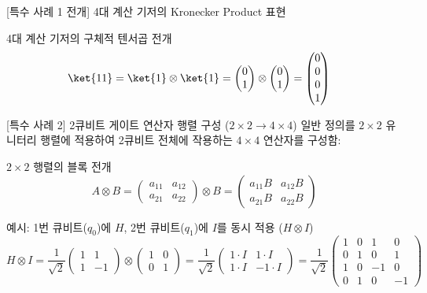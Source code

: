 \documentclass[aspectratio=169, 10pt]{beamer}
\begin{document}
\begin{frame}{[특수 사례 1 전개] 4대 계산 기저의 Kronecker Product 표현}
\begin{qcblock}{4대 계산 기저의 구체적 텐서곱 전개}
\begin{align*}
        \ket{11} &= \ket{1} \otimes \ket{1} = \begin{pmatrix} 0 \\ 1 \end{pmatrix} \otimes \begin{pmatrix} 0 \\ 1 \end{pmatrix} = \begin{pmatrix} 0 \\ 0 \\ 0 \\ 1 \end{pmatrix}
        \end{align*}
    \end{qcblock}
\end{frame}

\begin{frame}{[특수 사례 2] 2큐비트 게이트 연산자 행렬 구성 ($2 \times 2 \to 4 \times 4$)}
    일반 정의를 $2 \times 2$ 유니터리 행렬에 적용하여 2큐비트 전체에 작용하는 $4 \times 4$ 연산자를 구성함:
    \vspace{0.2cm}
    \begin{qcblock}{$2 \times 2$ 행렬의 블록 전개}
        $$A \otimes B = \begin{pmatrix} a_{11} & a_{12} \\ a_{21} & a_{22} \end{pmatrix} \otimes B = \begin{pmatrix} a_{11}B & a_{12}B \\ a_{21}B & a_{22}B \end{pmatrix}$$
    \end{qcblock}
    \pause
    \vspace{0.2cm}
    \begin{qctip}{예시: 1번 큐비트($q_0$)에 $H$, 2번 큐비트($q_1$)에 $I$를 동시 적용 ($H \otimes I$)}
        $$H \otimes I = \frac{1}{\sqrt{2}}\begin{pmatrix} 1 & 1 \\ 1 & -1 \end{pmatrix} \otimes \begin{pmatrix} 1 & 0 \\ 0 & 1 \end{pmatrix} = \frac{1}{\sqrt{2}}\begin{pmatrix} 1 \cdot I & 1 \cdot I \\ 1 \cdot I & -1 \cdot I \end{pmatrix} = \frac{1}{\sqrt{2}}\begin{pmatrix} 1 & 0 & 1 & 0 \\ 0 & 1 & 0 & 1 \\ 1 & 0 & -1 & 0 \\ 0 & 1 & 0 & -1 \end{pmatrix}$$
    \end{qctip}
\end{frame}
\end{document}

